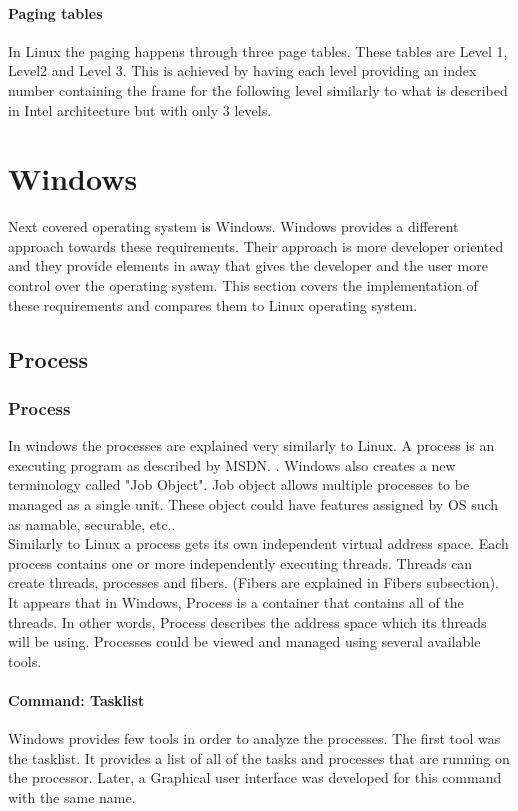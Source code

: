 \documentclass[journal,10pt,onecolumn,compsoc,letterpaper,draftclsnofoot,table,xcdraw]{IEEEtran} \usepackage[margin=0.75in]{geometry}
\begin{document}
\paragraph{Paging tables} In Linux the paging happens through three page tables. These tables are Level 1, Level2 and Level 3. This is achieved by having each level providing an index number containing the frame for the following level similarly to what is described in Intel architecture but with only 3 levels.

\section{Windows}
\noindent Next covered operating system is Windows. Windows provides a different approach towards these requirements. Their approach is more developer oriented and they provide elements in  away that gives the developer and the user more control over the operating system. This section covers the implementation of these requirements and compares them to Linux operating system.
\subsection{Process}
\subsubsection{Process}
\noindent In windows the processes are explained very similarly to Linux. A process is an executing program as described by MSDN. \cite{msdnprocess}. Windows also creates a new terminology called "Job Object". Job object allows multiple processes to be managed as a single unit. These object could have features assigned by OS such as namable, securable, etc.\cite{msdnprocess}. \\
\noindent Similarly to Linux a process gets its own independent virtual address space. Each process contains one or more independently executing threads. Threads can create threads, processes and fibers. (Fibers are explained in Fibers subsection). It appears that in Windows, Process is a container that contains all of the threads. In other words, Process describes the address space which its threads will be using. Processes could be viewed and managed using several available tools.
\paragraph{Command: Tasklist} Windows provides few tools in order to analyze the processes. The first tool was the tasklist. It provides a list of all of the tasks and processes that are running on the processor. Later, a Graphical user interface was developed for this command with the same name.
\end{document}

